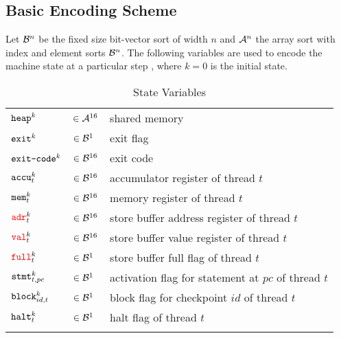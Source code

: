 
\subsection{Basic Encoding Scheme}

Let $\BVSORT[n]$ be the fixed size bit-vector sort of width $n$ and $\ASORT[n]$ the array sort with index and element sorts $\BVSORT[n]$.
The following variables are used to encode the machine state at a particular step , where $k = 0$ is the initial state.

\setlength{\tabulinesep}{3pt}
\begin{longtabu}{llX}
  \firsthline
  $\HEAP^k$ & $\in \ASORT$ & shared memory \\
  $\EXIT^k$ & $\in \BVSORT[1]$ & exit flag \\
  $\EXITCODE^k$ & $\in \BVSORT$ & exit code \\
  \hline
  $\ACCU^k_t$ & $\in \BVSORT$ & accumulator register of thread $t$ \\
  $\MEM^k_t$ & $\in \BVSORT$ &  memory register of thread $t$ \\
  $\SBADR^k_t$ & $\in \BVSORT$ & store buffer address register of thread $t$ \\
  $\SBVAL^k_t$ & $\in \BVSORT$ & store buffer value register of thread $t$ \\
  $\SBFULL^k_t$ & $\in \BVSORT[1]$ & store buffer full flag of thread $t$ \\
  $\STMT^k_{t, pc}$ & $\in \BVSORT[1]$ & activation flag for statement at $pc$ of thread $t$ \\
  $\BLOCK^k_{id, t}$ & $\in \BVSORT[1]$ & block flag for checkpoint $id$ of thread $t$ \\
  $\HALT^k_t$ & $\in \BVSORT[1]$ & halt flag of thread $t$ \\
  \lasthline
  \caption{State Variables}
  \label{tbl:states}
\end{longtabu}

\newcommand{\READ}{\texttt{read}}
\newcommand{\WRITE}{\texttt{write}}

